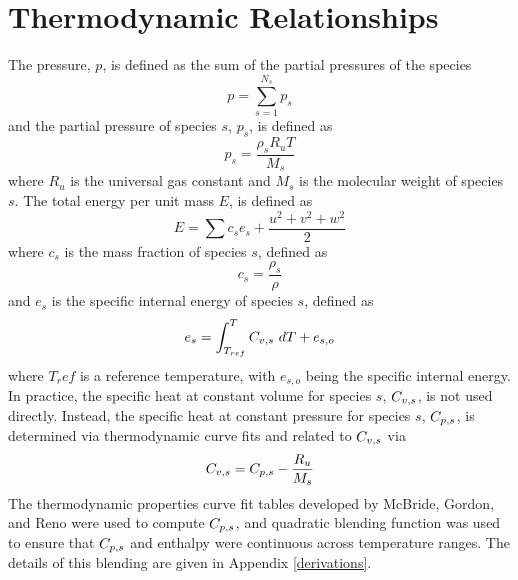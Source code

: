 \section{Thermodynamic Relationships}

The pressure, $p$, is defined as the sum of the partial pressures of the species
\begin{equation}
  p = \sum_{s=1}^{N_s} p_s
  \label{pressure-def}
\end{equation}
and the partial pressure of species $s$, $p_s$, is defined as
\begin{equation}
  p_s = \frac{\rho_s R_u T}{M_s}
  \label{partial-pressure-def}
\end{equation}
where $R_u$ is the universal gas constant and $M_s$ is the molecular weight of
species $s$.  The total energy per unit mass $E$, is defined as
\begin{equation} 
  E = \sum{c_s e_s} + \frac{u^2+v^2+w^2}{2} 
  \label{tot-energy-def}
\end{equation}
where $c_s$ is the mass fraction of species $s$, defined as
\begin{equation}
  c_s = \frac{\rho_s}{\rho}
  \label{mass-frac-def}
\end{equation}
and $e_s$ is the specific internal energy of species $s$, defined as
\begin{equation}
  e_s = \int_{T_{ref}}^{T} \cvs \ dT + e_{s,o}
  \label{int-energy-def}
\end{equation}
where $T_ref$ is a reference temperature, with $e_{s,o}$ being the specific
internal energy.  In practice, the specific heat at constant volume for species
$s$, $C_{v,s}$, is not used directly. Instead, the specific heat at constant
pressure for species $s$, $C_{p,s}$, is determined via thermodynamic curve
fits and related to $C_{v,s}$ via
\begin{equation}
  C_{v,s} = C_{p,s} - \frac{R_u}{M_s}
  \label{specific-heat-conversion}
\end{equation}
The thermodynamic properties curve fit tables developed by McBride, Gordon, and
Reno\cite{McBride} were used to compute $C_{p,s}$, and quadratic blending function
was used to ensure that $C_{p,s}$ and enthalpy were continuous across temperature
ranges.  The details of this blending are given in Appendix \ref{derivations}.

